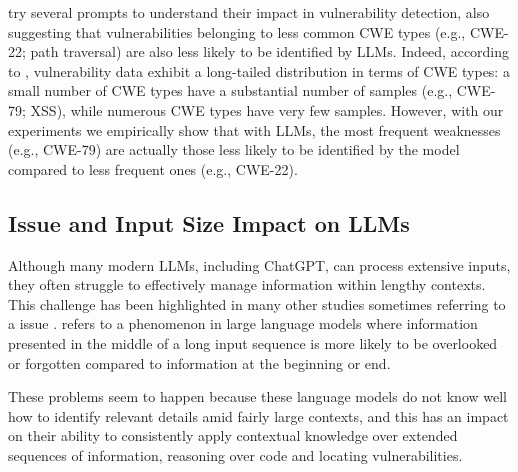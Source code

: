 	\citet{DBLP:journals/corr/abs-2401-15468} try several prompts to understand their impact in vulnerability detection, also suggesting that vulnerabilities belonging to less common \ac{CWE} types (e.g., CWE-22; path traversal) are also less likely to be identified by \acp{LLM}.
	Indeed, according to \citet{DBLP:conf/kbse/ZhouKXLHL23}, vulnerability data exhibit a long-tailed distribution in terms of \ac{CWE} types: a small number of \ac{CWE} types have a substantial number of samples (e.g., CWE-79; \ac{XSS}), while numerous \ac{CWE} types have very few samples. However, with our experiments we empirically show that with \acp{LLM}, the most frequent weaknesses (e.g., CWE-79) are actually those less likely to be identified by the model compared to less frequent ones (e.g., CWE-22).
	
	\subsection{ Issue and Input Size Impact on LLMs} \label{sec:related_work:lost_in_the_middle} \label{sec:background:needle_in_the_haystack}
	
	Although many modern \acp{LLM}, including ChatGPT, can process extensive inputs, they often struggle to effectively manage information within lengthy contexts. 
	This challenge has been highlighted in many other studies sometimes referring to a  issue \cite{liu2024lost}. 
	 refers to a phenomenon in large language models where information presented in the middle of a long input sequence is more likely to be overlooked or forgotten compared to information at the beginning or end.
	
	These problems seem to happen because these language models do not know well how to identify relevant details amid fairly large contexts, and this has an impact on their ability to consistently apply contextual knowledge over extended sequences of information, reasoning over code and locating vulnerabilities.
	
